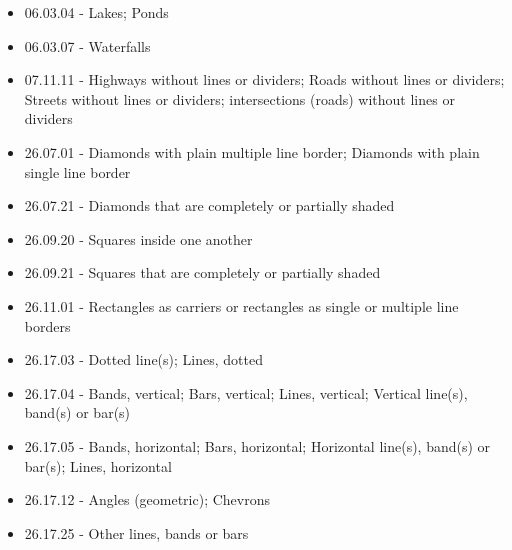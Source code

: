 \documentclass[aspectratio = 1610]{beamer}
\begin{document}
\begin{frame}
\begin{minipage}{.5\textwidth}
\begin{itemize}
\item 06.03.04 - Lakes; Ponds
\item 06.03.07 - Waterfalls
\item 07.11.11 - Highways without lines or dividers; Roads without lines or dividers; Streets without lines or dividers; intersections (roads) without lines or dividers
\item 26.07.01 - Diamonds with plain multiple line border; Diamonds with plain single line border
\item 26.07.21 - Diamonds that are completely or partially shaded
\item 26.09.20 - Squares inside one another
\item 26.09.21 - Squares that are completely or partially shaded
\item 26.11.01 - Rectangles as carriers or rectangles as single or multiple line borders
\item 26.17.03 - Dotted line(s); Lines, dotted
\item 26.17.04 - Bands, vertical; Bars, vertical; Lines, vertical; Vertical line(s), band(s) or bar(s)
\item 26.17.05 - Bands, horizontal; Bars, horizontal; Horizontal line(s), band(s) or bar(s); Lines, horizontal
\item 26.17.12 - Angles (geometric); Chevrons
\item 26.17.25 - Other lines, bands or bars

\end{itemize}
\end{minipage}

\end{frame}
\end{document}
